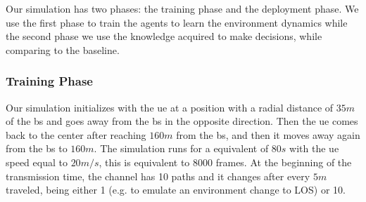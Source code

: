 Our simulation has two phases: the training phase and the deployment phase. We use the first phase to train the agents to learn the environment dynamics while the second phase we use the knowledge acquired to make decisions, while comparing to the baseline.

\subsubsection{Training Phase}
%

Our simulation initializes with the \gls{ue} at a position with a radial distance of $35m$ of the \gls{bs} and goes away from the \gls{bs} in the opposite direction.
%
Then the \gls{ue} comes back to the center after reaching $160m$ from the \gls{bs}, and then it moves away again from the \gls{bs} to $160m$.
%
The simulation runs for a equivalent of $80s$ with the \gls{ue} speed equal to $20m/s$, this is equivalent to 8000 frames.
%
At the beginning of the transmission time, the channel has 10 paths and it changes after every $5m$ traveled, being either 1 (e.g. to emulate an environment change to LOS) or 10.

